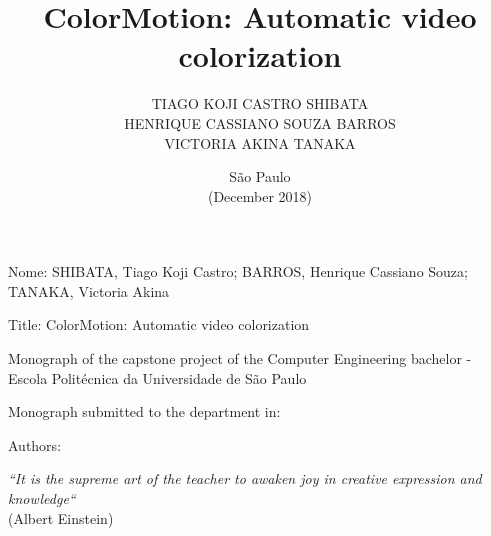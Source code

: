 \documentclass[12pt,openright,oneside,a4paper,english]{abntex2}
\author{TIAGO KOJI CASTRO SHIBATA\\
HENRIQUE CASSIANO SOUZA BARROS\\
VICTORIA AKINA TANAKA}
\title{ColorMotion: Automatic video colorization}
\date{São Paulo\\(December 2018)}
\begin{document}
\begin{otherlanguage}{english}

\imprimircapa
\imprimirfalsafolhaderosto
\imprimirfolhaderosto

\begin{folhadeaprovacao}
\noindent
Nome: SHIBATA, Tiago Koji Castro; BARROS, Henrique Cassiano Souza; TANAKA, Victoria Akina

\noindent
Title: ColorMotion: Automatic video colorization

\vspace{1cm}
\hspace{.2\textwidth} %
\begin{minipage}{.75\textwidth}
  \begin{espacoumemeio}
    \begin{sloppypar}
        Monograph of the capstone project of the Computer Engineering bachelor - Escola Politécnica da Universidade de São Paulo \\[0.3cm]
    \end{sloppypar}
  \end{espacoumemeio}
\end{minipage}

\noindent
Monograph submitted to the department in: \\

\begin{center}
Authors:
\end{center}

\hspace{5cm}
\hspace{5cm}
\hspace{5cm}

\end{folhadeaprovacao}

\begin{epigrafe}
\begin{flushright}
\vspace*{\fill}

\textit{``It is the supreme art of the teacher to awaken joy in creative expression and knowledge``}\\
(Albert Einstein)
\par\end{flushright}\end{epigrafe} %


\end{otherlanguage}
\end{document}
